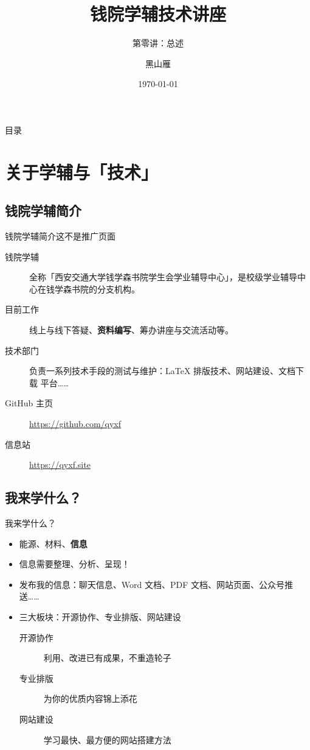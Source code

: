 \documentclass{beamer}
\title[Technical Lecture of QYXF]{钱院学辅技术讲座}
\subtitle{第零讲：总述}
\author[xjtu-blacksmith]{黑山雁}
\institute[Xi'an Jiaotong University]
{
  西安交通大学
}
\date{\today}
\begin{document}
\begin{frame}
\maketitle
\end{frame}

\begin{frame}{目录}
    \tableofcontents
\end{frame}

\section{关于学辅与「技术」}

\subsection{钱院学辅简介}
\begin{frame}{钱院学辅简介}{这不是推广页面}
\begin{description}
    \item[钱院学辅] 全称「西安交通大学钱学森书院学生会学业辅导中心」，是校级学业辅导中
    心在钱学森书院的分支机构。
    \item[目前工作] 线上与线下答疑、\textbf{资料编写}、筹办讲座与交流活动等。
    \item[技术部门] 负责一系列技术手段的测试与维护：\LaTeX{} 排版技术、网站建设、文档下载
    平台……
    \item[GitHub 主页] \url{https://github.com/qyxf}
    \item[信息站] \url{https://qyxf.site}   
\end{description}
\end{frame}



\subsection{我来学什么？}

\begin{frame}{我来学什么？}
\begin{itemize}
    \item 能源、材料、\textbf{信息}
    \item 信息需要整理、分析、呈现！
    \item 发布我的信息：聊天信息、Word 文档、PDF 文档、网站页面、公众号推送……
    \item 三大板块：开源协作、专业排版、网站建设
    \begin{description}
        \item[开源协作] 利用、改进已有成果，不重造轮子
        \item[专业排版] 为你的优质内容锦上添花
        \item[网站建设] 学习最快、最方便的网站搭建方法  
    \end{description}
\end{itemize}
\end{frame}
\end{document}
